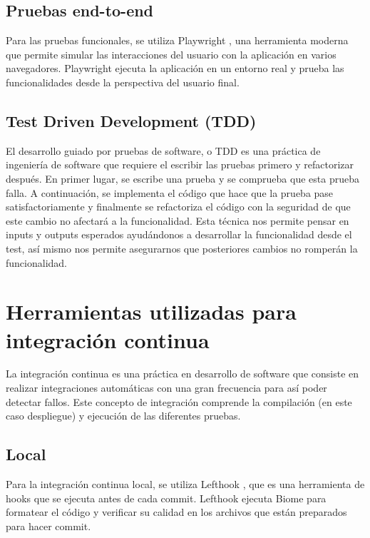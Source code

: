 \subsection{Pruebas end-to-end}
Para las pruebas funcionales, se utiliza Playwright \cite{playwright}, una herramienta moderna que permite simular las interacciones del usuario con la aplicación en varios navegadores. Playwright ejecuta la aplicación en un entorno real y prueba las funcionalidades desde la perspectiva del usuario final.

\subsection{Test Driven Development (TDD)}
El desarrollo guiado por pruebas de software, o TDD \cite{wiki:tdd} es una práctica de ingeniería de software que requiere el escribir las pruebas primero y refactorizar después. En primer lugar, se escribe una prueba y se comprueba que esta prueba falla. A continuación, se implementa el código que hace que la prueba pase satisfactoriamente y finalmente se refactoriza el código con la seguridad de que este cambio no afectará a la funcionalidad. Esta técnica nos permite pensar en inputs y outputs esperados ayudándonos a desarrollar la funcionalidad desde el test, así mismo nos permite asegurarnos que posteriores cambios no romperán la funcionalidad.

\section{Herramientas utilizadas para integración continua}
La integración continua es una práctica en desarrollo de software que consiste en realizar integraciones automáticas con una gran frecuencia para así poder detectar fallos. Este concepto de integración comprende la compilación (en este caso despliegue) y ejecución de las diferentes pruebas.

\subsection{Local}
Para la integración continua local, se utiliza Lefthook \cite{lefthook}, que es una herramienta de hooks que se ejecuta antes de cada commit. Lefthook ejecuta Biome para formatear el código y verificar su calidad en los archivos que están preparados para hacer commit.

